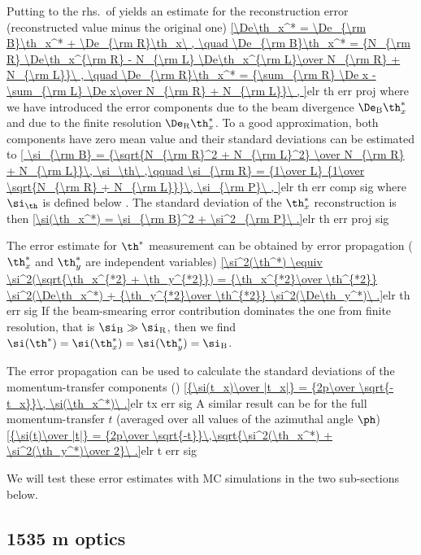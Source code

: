 Putting  to the rhs.~of yields an estimate for the reconstruction error (reconstructed value minus the original one)
\eqref{\De\th_x^* = \De_{\rm B}\th_x^* + \De_{\rm R}\th_x\ ,
	\quad \De_{\rm B}\th_x^* = {N_{\rm R} \De\th_x^{\rm R} - N_{\rm L} \De\th_x^{\rm L}\over N_{\rm R} + N_{\rm L}}\ ,
	\quad \De_{\rm R}\th_x^* = {\sum_{\rm R} \De x - \sum_{\rm L} \De x\over  N_{\rm R} + N_{\rm L}}\ ,
}{elr th err proj}
where we have introduced the error components due to the beam divergence $\De_{\rm B}\th_x^*$ and due to the finite resolution $\De_{\rm R}\th_x^*$. To a good approximation, both components have zero mean value and their standard deviations can be estimated to
\eqref{
	\si_{\rm B} = {\sqrt{N_{\rm R}^2 + N_{\rm L}^2} \over N_{\rm R} + N_{\rm L}}\, \si_\th\ ,\qquad
	\si_{\rm R} = {1\over L} {1\over \sqrt{N_{\rm R} + N_{\rm L}}}\, \si_{\rm P}\ ,
}{elr th err comp sig}
where $\si_\th$ is defined below . The standard deviation of the $\th_x^*$ reconstruction is then
\eqref{\si(\th_x^*) = \si_{\rm B}^2 + \si^2_{\rm P}\ .}{elr th err proj sig}

The error estimate for $\th^*$ measurement can be obtained by error propagation ($\th_x^*$ and $\th_y^*$ are independent variables)
\eqref{\si^2(\th^*) \equiv \si^2(\sqrt{\th_x^{*2} + \th_y^{*2}}) = {\th_x^{*2}\over \th^{*2}} \si^2(\De\th_x^*) + {\th_y^{*2}\over \th^{*2}} \si^2(\De\th_y^*)\ .}{elr th err sig}
If the beam-smearing error contribution dominates the one from finite resolution, that is $\si_{\rm B} \gg \si_{\rm R}$, then we find $\si(\th^*) = \si(\th_x^*) = \si(\th_y^*) = \si_{\rm B}$.

The error propagation can be used to calculate the standard deviations of the momentum-transfer components ()
\eqref{{\si(t_x)\over |t_x|} = {2p\over \sqrt{-t_x}}\, \si(\th_x^*)\ .}{elr tx err sig}
A similar result can be for the full momentum-transfer $t$ (averaged over all values of the azimuthal angle $\ph$)
\eqref{{\si(t)\over |t|} = {2p\over \sqrt{-t}}\,\sqrt{\si^2(\th_x^*) + \si^2(\th_y^*)\over 2}\ .}{elr t err sig}

We will test these error estimates with MC simulations in the two sub-sections below.


\subsection[elr 1535]{1535 m optics}

\bmfig
{}
\emfig

